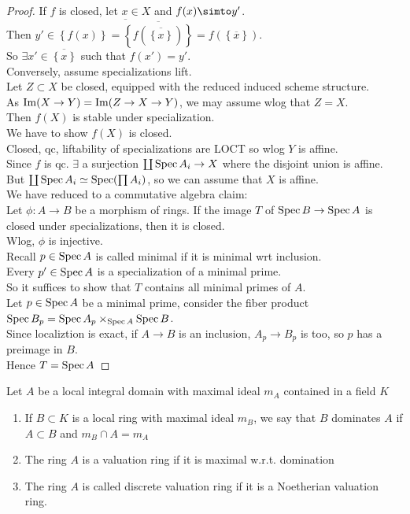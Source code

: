 \documentclass[../main.tex]{subfiles}
\begin{document}
\begin{proof}
If $f$ is closed, let $x\in X$ and $f( x) \simto y'$.\\
Then $y' \in \overline{\left\{ f( x)  \right\} = \overline{ \left\{ f(  \overline{\left\{ x \right\} })  \right\} }}= f(  \left\{ \overline{x} \right\} ) $.\\
So $\exists x' \in \overline{\left\{ x \right\} }$ such that $f( x') = y'$.\\
Conversely, assume specializations lift.\\
Let $Z \subset X$ be closed, equipped with the reduced induced scheme structure.\\
As $\operatorname{Im} ( X\to Y) = \operatorname{Im}( Z\to X \to Y) $, we may assume wlog that $Z= X$.\\
Then $f( X) $ is stable under specialization.\\
We have to show $f( X) $ is closed.\\
Closed, qc, liftability of specializations are LOCT so wlog $Y$ is affine.\\
Since $f$ is qc. $\exists$ a surjection $\coprod \operatorname{Spec} A_i \to X$ where the disjoint union is affine.\\
But $\coprod \operatorname{Spec} A_i \simeq \operatorname{Spec} ( \prod A_i) $, so we can assume that $X$ is affine.\\
We have reduced to a commutative algebra claim:\\
Let $\phi: A\to B$ be a morphism of rings. If the image $T$ of $\operatorname{Spec} B \to \operatorname{Spec} A$ is closed under specializations, then it is closed.\\
Wlog, $\phi$ is injective.\\
Recall $p \in \operatorname{Spec} A$ is called minimal if it is minimal wrt inclusion.\\
Every $p'\in \operatorname{Spec} A$ is a specialization of a minimal prime.\\
So it suffices to show that $T$ contains all minimal primes of $A$.\\
Let $p \in \operatorname{Spec} A$ be a minimal prime, consider the fiber product $\operatorname{Spec} B_p = \operatorname{Spec} A_p \times_{\operatorname{Spec} A} \operatorname{Spec} B$.\\
Since localiztion is exact, if $A \to B$ is an inclusion, $A_p \to B_p$ is too, so $p$ has a preimage in $B$.\\
Hence $T= \operatorname{Spec} A$ 
\end{proof}
\begin{defn}
	Let $A$ be a local integral domain with maximal ideal $m_A$ contained in a field $K$ 
	\begin{enumerate}
	\item If $B \subset K$ is a local ring with maximal ideal $m_B$, we say that $B$ dominates $A$ if $A \subset B$ and $m_B\cap A = m_A$ 
	\item The ring $A$ is a valuation ring if it is maximal w.r.t. domination
	\item The ring $A$ is called discrete valuation ring if it is a Noetherian valuation ring.
	\end{enumerate}
\end{defn}
\end{document}
